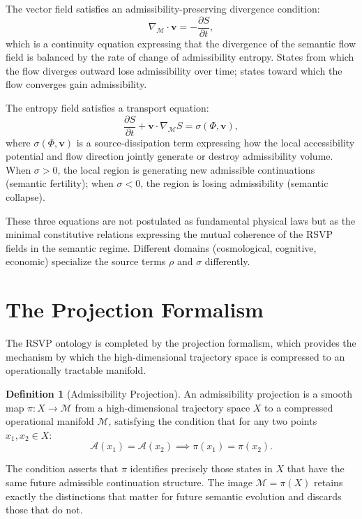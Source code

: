 \documentclass[12pt, a4paper, openany]{book}
\theoremstyle{plain}
\theoremstyle{definition}
\newtheorem{definition}[theorem]{Definition}
\theoremstyle{remark}
\newcommand{\vvec}{\mathbf{v}}
\newcommand{\Sfield}{S}
\newcommand{\Adm}{\mathcal{A}}
\begin{document}
The vector field satisfies an admissibility-preserving divergence condition:
\begin{equation}\label{eq:vector}
\nabla_{\mathcal{M}} \cdot \vvec = -\frac{\partial \Sfield}{\partial t},
\end{equation}
which is a continuity equation expressing that the divergence of the semantic flow field is balanced by the rate of change of admissibility entropy. States from which the flow diverges outward lose admissibility over time; states toward which the flow converges gain admissibility.

The entropy field satisfies a transport equation:
\begin{equation}\label{eq:entropy}
\frac{\partial \Sfield}{\partial t} + \vvec \cdot \nabla_{\mathcal{M}} \Sfield = \sigma(\Phi, \vvec),
\end{equation}
where $\sigma(\Phi, \vvec)$ is a source-dissipation term expressing how the local accessibility potential and flow direction jointly generate or destroy admissibility volume. When $\sigma > 0$, the local region is generating new admissible continuations (semantic fertility); when $\sigma < 0$, the region is losing admissibility (semantic collapse).

These three equations are not postulated as fundamental physical laws but as the minimal constitutive relations expressing the mutual coherence of the RSVP fields in the semantic regime. Different domains (cosmological, cognitive, economic) specialize the source terms $\rho$ and $\sigma$ differently.

\section{The Projection Formalism}

The RSVP ontology is completed by the projection formalism, which provides the mechanism by which the high-dimensional trajectory space is compressed to an operationally tractable manifold.

\begin{definition}[Admissibility Projection]
An admissibility projection is a smooth map $\pi: X \to \mathcal{M}$ from a high-dimensional trajectory space $X$ to a compressed operational manifold $\mathcal{M}$, satisfying the condition that for any two points $x_1, x_2 \in X$:
\[
\Adm(x_1) = \Adm(x_2) \implies \pi(x_1) = \pi(x_2).
\]
\end{definition}

The condition asserts that $\pi$ identifies precisely those states in $X$ that have the same future admissible continuation structure. The image $\mathcal{M} = \pi(X)$ retains exactly the distinctions that matter for future semantic evolution and discards those that do not.
\end{document}
